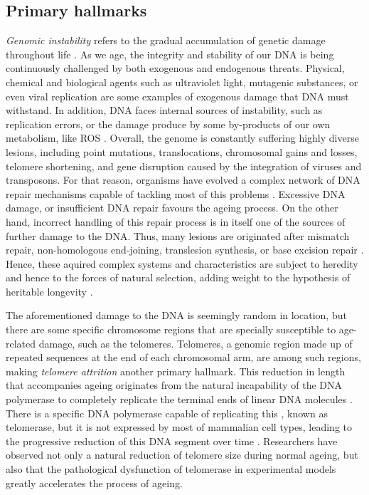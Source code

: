 \subsection{Primary hallmarks} \label{ss_intro_hallmarks_primary}

\emph{Genomic instability} refers to the gradual accumulation of genetic damage throughout life \cite{Moskalev2013}.
As we age, the integrity and stability of our DNA is being continuously challenged by both exogenous and endogenous threats.
Physical, chemical and biological agents such as  ultraviolet light, mutagenic substances, or even viral replication are some examples of exogenous damage that DNA must withstand.
In addition, DNA faces internal sources of instability, such as replication errors, or the damage produce by some by-products of our own metabolism, like ROS \cite{Hoeijmakers2009}.
Overall, the genome is constantly suffering highly diverse lesions, including point mutations, translocations, chromosomal gains and losses, telomere shortening, and gene disruption caused by the integration of viruses and transposons.
For that reason, organisms have evolved a complex network of DNA repair mechanisms capable of tackling most of this problems \cite{Lord2012}.
Excessive DNA damage, or insufficient DNA repair favours the ageing process.
On the other hand, incorrect handling of this repair process is in itself one of the sources of further damage to the DNA.
Thus, many lesions are originated after mismatch repair, non-homologous end-joining, translesion synthesis, or base excision repair \cite{Agathangelou2018}.
Hence, these aquired complex systems and characteristics are subject to heredity and hence to the forces of natural selection, adding weight to the hypothesis of heritable longevity \cite{Lord2012}.

The aforementioned damage to the DNA is seemingly random in location, but there are some specific chromosome regions that are specially susceptible to age-related dam\-age, such as the telomeres.
Telomeres, a genomic region made up of repeated sequences at the end of each chromosomal arm, are among such regions, making \emph{telomere attrition} another primary hallmark.
This reduction in length that accompanies ageing originates from the natural incapability of the DNA polymerase to completely replicate the terminal ends of linear DNA molecules \cite{Turner2019}.
There is a specific DNA polymerase capable of replicating this , known as telomerase, but it is not expressed by most of mammalian cell types, leading to the progressive reduction of this DNA segment over time \cite{Shay2016}.
Researchers have observed not only a natural reduction of telomere size during normal ageing, but also that the pathological dysfunction of telomerase in experimental models greatly accelerates the process of ageing.

